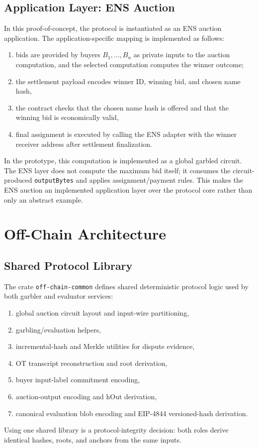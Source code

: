 \documentclass[final,twoside]{vutinfth}
\begin{document}
\subsection{Application Layer: ENS Auction}
In this proof-of-concept, the protocol is instantiated as an ENS auction application.
The application-specific mapping is implemented as follows:
\begin{enumerate}
\item bids are provided by buyers $B_1,\dots,B_n$ as private inputs to the auction computation, and the selected computation computes the winner outcome;
\item the settlement payload encodes winner ID, winning bid, and chosen name hash,
\item the contract checks that the chosen name hash is offered and that the winning bid is economically valid,
\item final assignment is executed by calling the ENS adapter with the winner receiver address after settlement finalization.
\end{enumerate}
In the prototype, this computation is implemented as a global garbled circuit.
The ENS layer does not compute the maximum bid itself; it consumes the
circuit-produced \texttt{outputBytes} and applies assignment/payment rules.
This makes the ENS auction an implemented application layer over the protocol core rather than only an abstract example.

\section{Off-Chain Architecture}
\subsection{Shared Protocol Library}
The crate \texttt{off-chain-common} defines shared deterministic protocol logic
used by both garbler and evaluator services:
\begin{enumerate}
\item global auction circuit layout and input-wire partitioning,
\item garbling/evaluation helpers,
\item incremental-hash and Merkle utilities for dispute evidence,
\item OT transcript reconstruction and root derivation,
\item buyer input-label commitment encoding,
\item auction-output encoding and $\mathrm{hOut}$ derivation,
\item canonical evaluation blob encoding and EIP-4844 versioned-hash derivation.
\end{enumerate}
Using one shared library is a protocol-integrity decision: both roles derive identical hashes, roots, and anchors from the same inputs.
\end{document}
